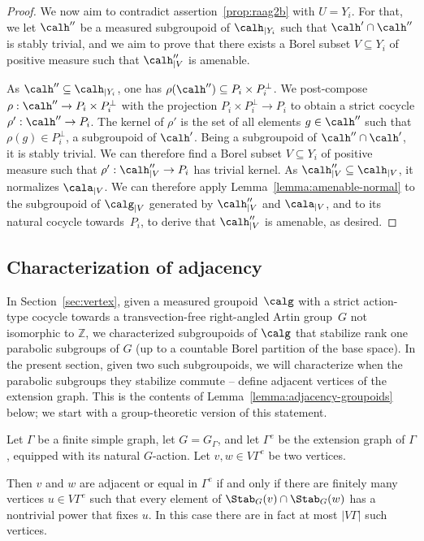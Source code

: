 \begin{proof}
We now aim to contradict assertion~\eqref{prop:raag2b} with $U=Y_i$. For that, we let $\calh''$ be a measured subgroupoid of $\calh_{|Y_i}$ such that $\calh'\cap\calh''$ is stably trivial, and we aim to prove that there exists a Borel subset $V\subseteq Y_i$ of positive measure such that $\calh''_{|V}$ is amenable.

As $\calh''\subseteq\calh_{|Y_i}$, one has $\rho(\calh'')\subseteq P_i\times P_i^{\perp}$. We post-compose $\rho:\calh''\to P_i\times P_i^{\perp}$ with the projection $P_i\times P_i^{\perp}\to P_i$ to obtain a strict cocycle $\rho':\calh''\to P_i$. The kernel of $\rho'$ is the set of all elements $g\in\calh''$ such that $\rho(g)\in P_i^{\perp}$, a subgroupoid of $\calh'$. Being a subgroupoid of $\calh''\cap\calh'$, it is stably trivial. We can therefore find a Borel subset $V\subseteq Y_i$ of positive measure such that $\rho':\calh''_{|V}\to P_i$ has trivial kernel. As $\calh''_{|V}\subseteq\calh_{|V}$, it normalizes $\cala_{|V}$. We can therefore apply Lemma~\ref{lemma:amenable-normal} to the subgroupoid of $\calg_{|V}$ generated by $\calh''_{|V}$ and $\cala_{|V}$, and to its natural cocycle towards~$P_i$, to derive that $\calh''_{|V}$ is amenable, as desired.
\end{proof}

\subsection{Characterization of adjacency}

In Section~\ref{sec:vertex}, given a measured groupoid~$\calg$ with a strict action-type cocycle towards a transvection-free right-angled Artin group~$G$ not isomorphic to $\mathbb{Z}$, we characterized subgroupoids of $\calg$ that stabilize rank one parabolic subgroups of $G$ (up to a countable Borel partition of the base space). In the present section, given two such subgroupoids, we will characterize when the parabolic subgroups they stabilize commute -- \ie define adjacent vertices of the extension graph. This is the contents of Lemma~\ref{lemma:adjacency-groupoids} below; we start with a group-theoretic version of this statement.

\begin{lemma}
\label{lem:fix point}
Let $\Gamma$ be a finite simple graph, let $G=G_\Gamma$, and let $\Gamma^e$ be the extension graph of $\Gamma$, equipped with its natural $G$-action. Let $v,w\in V\Gamma^e$ be two vertices.

Then $v$ and $w$ are adjacent or equal in $\Gamma^e$ if and only if there are finitely many vertices $u\in V\Gamma^e$ such that every element of $\Stab_G(v)\cap\Stab_G(w)$ has a nontrivial power that fixes $u$. In this case there are in fact at most $|V\Gamma|$ such vertices.
\end{lemma}

